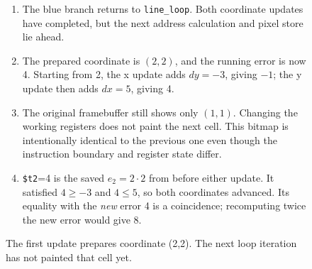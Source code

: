 \begin{figure}[htbp]
  \par\smallskip
  \begin{minipage}{\linewidth}
    \small
    \begin{enumerate}
      \item The blue branch returns to \texttt{line\_loop}. Both coordinate updates have completed, but the next address calculation and pixel store lie ahead.
      \item The prepared coordinate is $(2,2)$, and the running error is now 4. Starting from 2, the x update adds $dy=-3$, giving $-1$; the y update then adds $dx=5$, giving 4.
      \item The original framebuffer still shows only $(1,1)$. Changing the working registers does not paint the next cell. This bitmap is intentionally identical to the previous one even though the instruction boundary and register state differ.
      \item \texttt{\$t2}=4 is the saved $e_2=2\cdot2$ from before either update. It satisfied $4\geq-3$ and $4\leq5$, so both coordinates advanced. Its equality with the \emph{new} error 4 is a coincidence; recomputing twice the new error would give 8.
    \end{enumerate}
  \end{minipage}
  \caption{The first update prepares coordinate (2,2). The next loop iteration has not painted that cell yet.}
  \label{capture:007-bresenham-line-f02-update}
\end{figure}
\par
